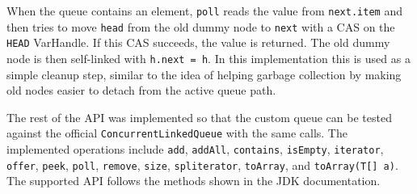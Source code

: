
When the queue contains an element, \texttt{poll} reads the value from \texttt{next.item} and then tries to move \texttt{head} from the old dummy node to \texttt{next} with a CAS on the \texttt{HEAD} VarHandle. If this CAS succeeds, the value is returned. The old dummy node is then self-linked with \texttt{h.next = h}. In this implementation this is used as a simple cleanup step, similar to the idea of helping garbage collection by making old nodes easier to detach from the active queue path.

The rest of the API was implemented so that the custom queue can be tested against the official \texttt{ConcurrentLinkedQueue} with the same calls. The implemented operations include \texttt{add}, \texttt{addAll}, \texttt{contains}, \texttt{isEmpty}, \texttt{iterator}, \texttt{offer}, \texttt{peek}, \texttt{poll}, \texttt{remove}, \texttt{size}, \texttt{spliterator}, \texttt{toArray}, and \texttt{toArray(T[] a)}. The supported API follows the methods shown in the JDK documentation. \cite{clq-docs}

